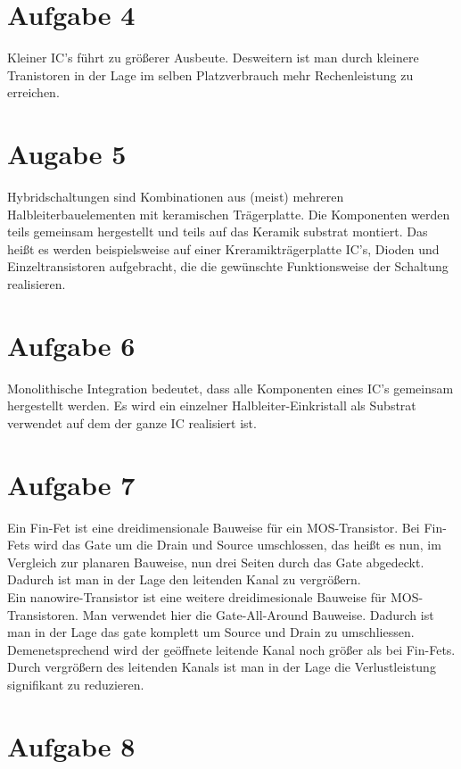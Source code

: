 \documentclass[a4paper]{scrartcl}
\begin{document}
\section*{Aufgabe 4}
Kleiner IC's führt zu größerer Ausbeute. Desweitern ist man durch kleinere Tranistoren in der Lage im selben Platzverbrauch mehr Rechenleistung zu erreichen.


\section*{Augabe 5}
Hybridschaltungen sind Kombinationen aus (meist) mehreren Halbleiterbauelementen mit keramischen Trägerplatte. Die Komponenten werden teils gemeinsam hergestellt und teils auf das Keramik substrat montiert. Das heißt es werden beispielsweise auf einer Kreramikträgerplatte IC's, Dioden und Einzeltransistoren aufgebracht, die die gewünschte Funktionsweise der Schaltung realisieren.


\section*{Aufgabe 6}
Monolithische Integration bedeutet, dass alle Komponenten eines IC's gemeinsam hergestellt werden. Es wird ein einzelner Halbleiter-Einkristall als Substrat verwendet auf dem der ganze IC realisiert ist.


\section*{Aufgabe 7}
Ein Fin-Fet ist eine dreidimensionale Bauweise für ein MOS-Transistor. Bei Fin-Fets wird das Gate um die Drain und Source umschlossen, das heißt es nun, im Vergleich zur planaren Bauweise, nun drei Seiten durch das Gate abgedeckt. Dadurch ist man in der Lage den leitenden Kanal zu vergrößern.\\
Ein nanowire-Transistor ist eine weitere dreidimesionale Bauweise für MOS-Transistoren. Man verwendet hier die Gate-All-Around Bauweise. Dadurch ist man in der Lage das gate komplett um Source und Drain zu umschliessen. Demenetsprechend wird der geöffnete leitende Kanal noch größer als bei Fin-Fets. Durch vergrößern des leitenden Kanals ist man in der Lage die Verlustleistung signifikant zu reduzieren.


\section*{Aufgabe 8}
\end{document}
